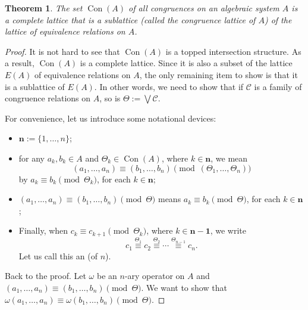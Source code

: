 \documentclass[12pt]{article}
\newtheorem{thm}{Theorem}
\newcommand{\Con}[1]{\operatorname{Con}(#1)}
\begin{document}
\begin{thm} The set $\operatorname{Con}(A)$ of all congruences on an algebraic system $A$ is a complete lattice that is a sublattice (called the \emph{congruence lattice} of $A$) of the lattice of equivalence relations on $A$.
\end{thm}

\begin{proof}
It is not hard to see that $\Con A$ is a topped intersection structure.  As a result, $\Con A$ is a complete lattice.  Since it is also a subset of the lattice $E(A)$ of equivalence relations on $A$, the only remaining item to show is that it is a sublattice of $E(A)$.  In other words, we need to show that if $\mathcal{C}$ is a family of congruence relations on $A$, so is $\Theta:=\bigvee \mathcal{C}$.

For convenience, let us introduce some notational devices:
\begin{itemize}
\item $\mathbf{n}:=\lbrace 1,\ldots,n\rbrace$;
\item for any $a_k,b_k\in A$ and $\Theta_k\in\Con A$, where $k\in \mathbf{n}$, we mean $$(a_1,\ldots,a_n)\equiv (b_1,\ldots, b_n)\pmod{(\Theta_1,\ldots,\Theta_n)}$$ by $a_k\equiv b_k\pmod {\Theta_k}$, for each $k\in \mathbf{n}$;
\item $(a_1,\ldots,a_n)\equiv (b_1,\ldots, b_n)\pmod{\Theta}$ means $a_k\equiv b_k\pmod \Theta$, for each $k\in \mathbf{n}$;
\item Finally, when $c_k\equiv c_{k+1}\pmod {\Theta_k}$, where $k\in \mathbf{n-1}$, we write $$c_1\stackrel{\Theta_1}{\equiv} c_2\stackrel{\Theta_2}{\equiv} \cdots \stackrel{\Theta_{n-1}}{\equiv }c_n.$$
Let us call this an  (of  $n$).
\end{itemize}

Back to the proof.  Let $\omega$ be an $n$-ary operator on $A$ and $(a_1,\ldots,a_n)\equiv (b_1,\ldots,b_n)\pmod \Theta$.  We want to show that $\omega(a_1,\ldots,a_n)\equiv \omega(b_1,\ldots,b_n)\pmod \Theta$.


\end{proof}
\end{document}
